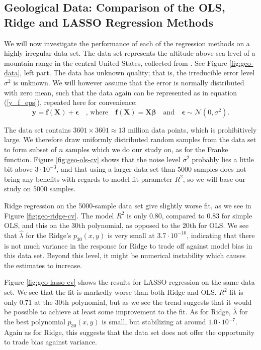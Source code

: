 \documentclass[]{article}
\begin{document}
\subsection{Geological Data: Comparison of the OLS, Ridge and LASSO Regression Methods}
We will now investigate the performance of each of the regression methods on a highly irregular data set. The data set represents the altitude above sea level of a mountain range in the central United States, collected from \cite{geo-data}. See Figure \ref{fig:geo-data}, left part. The data has unknown quality; that is, the irreducible error level $\sigma^2$ is unknown. We will however assume that the error is normally distributed with zero mean, such that the data again can be represented as in equation (\ref{y_f_eps}), repeated here for convenience:
\begin{equation*}
\mathbf{y} = \mathbf{f}(\mathbf{X}) + \mathbf{\epsilon} \quad \text{, where} \quad \mathbf{f}(\mathbf{X}) = \mathbf{X} \mathbf{\beta} \quad \text{and} \quad \mathbf{\epsilon} \sim \mathcal{N}(0, \sigma^2).
\end{equation*}

The data set contains $3601 \times 3601 \approx 13$ million data points, which is prohibitively large. We therefore draw uniformly distributed random samples from the data set to form subset of $n$ samples which we do our study on, as for the Franke function. Figure \ref{fig:geo-ols-cv} shows that the noise level $\sigma^2$ probably lies a little bit above $3 \cdot 10^{-3}$, and that using a larger data set than 5000 samples does not bring any benefits with regards to model fit parameter $R^2$, so we will base our study on 5000 samples.

Ridge regression on the 5000-sample data set give slightly worse fit, as we see in Figure \ref{fig:geo-ridge-cv}. The model $R^2$ is only 0.80, compared to 0.83 for simple OLS, and this on the 30th polynomial, as opposed to the 20th for OLS. We see that $\hat{\lambda}$ for the Ridge's $p_{30}(x,y)$ is very small at $3.7 \cdot 10^{-10}$, indicating that there is not much variance in the response for Ridge to trade off against model bias in this data set. Beyond this level, it might be numerical instability which causes the estimates to increase.

Figure \ref{fig:geo-lasso-cv} shows the results for LASSO regression on the same data set. We see that the fit is markedly worse than both Ridge and OLS. $R^2$ fit is only 0.71 at the 30th polynomial, but as we see the trend suggests that it would be possible to achieve at least some improvement to the fit. As for Ridge, $\hat{\lambda}$ for the best polynomial $p_{30}(x,y)$ is small, but stabilizing at around $1.0 \cdot 10^{-7}$. Again as for Ridge, this suggests that the data set does not offer the opportunity to trade bias against variance.
\end{document}
